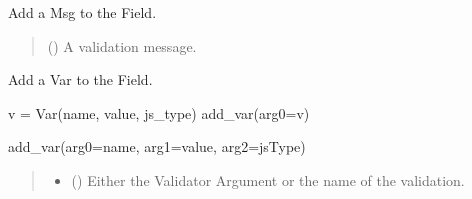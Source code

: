\documentclass[letterpaper,10pt,english]{sphinxmanual}
\begin{document}
\begin{fulllineitems}
\begin{fulllineitems}
\label{\detokenize{apache_commons_validator_python:apache_commons_validator_python.field_new.Field.add_msg}}
\pysigstartsignatures
{}
\pysigstopsignatures
\sphinxAtStartPar
Add a Msg to the Field.
\begin{quote}\begin{description}
\sphinxAtStartPar
{} ({\hyperref[\detokenize{apache_commons_validator_python:apache_commons_validator_python.msg_new.Msg}]{}}) \textendash{} A validation message.

\end{description}\end{quote}

\end{fulllineitems}


\begin{fulllineitems}
\label{\detokenize{apache_commons_validator_python:apache_commons_validator_python.field_new.Field.add_var}}
\pysigstartsignatures
{}
\pysigstopsignatures
\sphinxAtStartPar
Add a Var to the Field.
\begin{description}
\sphinxAtStartPar
v = Var(name, value, js\_type)
add\_var(arg0=v)

\sphinxAtStartPar
add\_var(arg0=name, arg1=value, arg2=jsType)

\end{description}
\begin{quote}\begin{description}
\begin{itemize}
\item {} 
\sphinxAtStartPar
{} () \textendash{} Either the Validator Argument or the name of the validation.


\end{itemize}
\end{description}
\end{quote}
\end{fulllineitems}
\end{fulllineitems}
\end{document}
